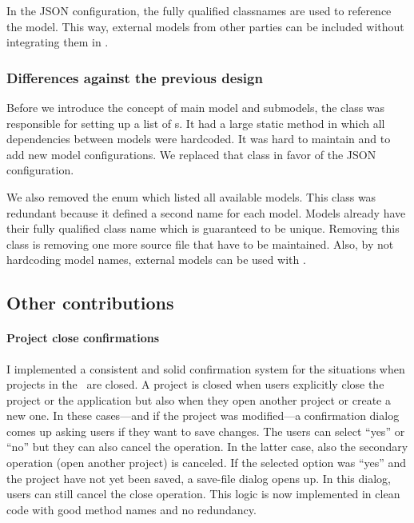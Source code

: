 In the \acs{JSON} configuration, the fully qualified classnames are used to
reference the model.
This way, external models from other parties can be included without integrating
them in \vadere.

\subsubsection{Differences against the previous design}

Before we introduce the concept of main model and submodels, the
 class was responsible for setting up a list of
s.
It had a large static method in which all dependencies between models were
hardcoded.
It was hard to maintain and to add new model configurations.
We replaced that class in favor of the \acs{JSON} configuration.

We also removed the enum  which listed all available models.
This class was redundant because it defined a second name for each model.
Models already have their fully qualified class name which is guaranteed to be
unique.
Removing this class is removing one more source file that have to be
maintained.
Also, by not hardcoding model names, external models can be used with \vadere.

\subsection{Other contributions}


\paragraph{Project close confirmations}

I implemented a consistent and solid confirmation system for the situations when
projects in the \vaderegui\ are closed.
A project is closed when users explicitly close the project or the application
but also when they open another project or create a new one.
In these cases---and if the project was modified---a confirmation dialog comes
up asking users if they want to save changes.
The users can select ``yes'' or ``no'' but they can also cancel the operation.
In the latter case, also the secondary operation (\eg open another project) is
canceled.
If the selected option was ``yes'' and the project have not yet been saved, a
save-file dialog opens up.
In this dialog, users can still cancel the close operation.
This logic is now implemented in clean code with good method names and no
redundancy.

